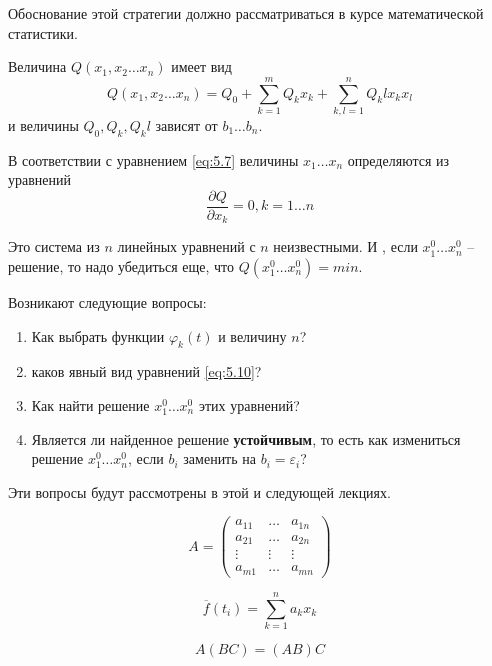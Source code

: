 Обоснование этой стратегии должно рассматриваться в курсе математической статистики.

Величина $Q(x_1, x_2 \dots x_n)$ имеет вид
\begin{equation}
	Q(x_1, x_2 \dots x_n) = Q_0 + \sum_{k=1}^m{Q_k x_k } + \sum_{k, l=1}^n {Q_kl x_k x_l}
\end{equation}
и величины $Q_0, Q_k, Q_kl$ зависят от $b_1 \dots b_n$.


В соответствии с уравнением \ref{eq:5.7} величины  $x_1 \dots x_n$ определяются из уравнений
\begin{equation} \label{eq:5.10}
	 \frac{\partial Q}{\partial x_k } = 0, k = 1 \dots n
\end{equation}

Это система из $n$ линейных уравнений с $n$ неизвестными. И , если $x_1^0 \dots x_n^0$ -- решение, то надо убедиться еще, что $Q(x_1^0 \dots x_n^0) = min$.

Возникают следующие вопросы: 
\begin{enumerate}[nolistsep]
	\item Как выбрать функции $\varphi_k (t) $  и величину $n$?
	\item каков явный вид уравнений \ref{eq:5.10}?
	\item Как найти решение $x_1^0 \dots x_n^0$ этих уравнений?
	\item Является ли найденное решение \textbf{устойчивым}, то есть как измениться решение $x_1^0 \dots x_n^0$, если $b_i$ заменить на  $b_i = \varepsilon_i $?
\end{enumerate}

Эти вопросы будут рассмотрены в этой и следующей лекциях.


\begin{equation}
	A =
	\begin{pmatrix}
	a_{11} & \dots & a_{1n}\\
	a_{21} & \dots & a_{2n}\\
	\vdots & \vdots & \vdots \\
	a_{m1} & \dots & a_{mn}
	\end{pmatrix}
\end{equation}

\begin{equation}
	\overline{f} (t_i) = \sum_{k=1}^n {a_k x_k}
\end{equation}

\begin{equation}
	A (BC) = (AB) C
\end{equation}

